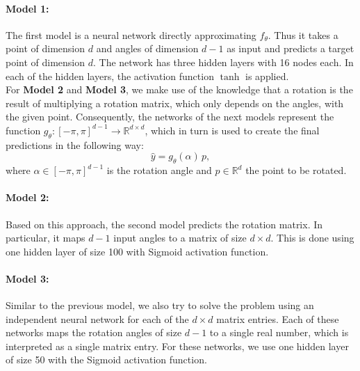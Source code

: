 \paragraph{Model 1:}The first model is a neural network directly approximating $f_\theta$. Thus it takes a point of dimension $d$ and angles of dimension $d-1$ as input and predicts a target point of dimension $d$. The network has three hidden layers with 16 nodes each. In each of the hidden layers, the activation function $\tanh$ is applied.\\

For \textbf{Model 2} and \textbf{Model 3}, we make use of the knowledge that a rotation is the result of multiplying a rotation matrix, which only depends on the angles, with the given point. Consequently, the networks of the next models represent the function $g_\theta: [-\pi, \pi]^{d-1} \to \mathbb{R}^{d \times d}$, which in turn is used to create the final predictions in the following way:
\begin{equation}
\label{eq:rot_pred}
\hat{y} = g_\theta(\alpha) \, p,
\end{equation}
where $\alpha \in [-\pi, \pi]^{d-1}$ is the rotation angle and $p \in \mathbb{R}^d$ the point to be rotated.

\paragraph{Model 2:} Based on this approach, the second model predicts the rotation matrix. In particular, it maps $d-1$ input angles to a matrix of size $d \times d$. This is done using one hidden layer of size 100 with Sigmoid activation function. 

\paragraph{Model 3:} Similar to the previous model, we also try to solve the problem using an independent neural network for each of the $d \times d$ matrix entries. Each of these networks maps the rotation angles of size $d-1$ to a single real number, which is interpreted as a single matrix entry. For these networks, we use one hidden layer of size 50 with the Sigmoid activation function.\\

